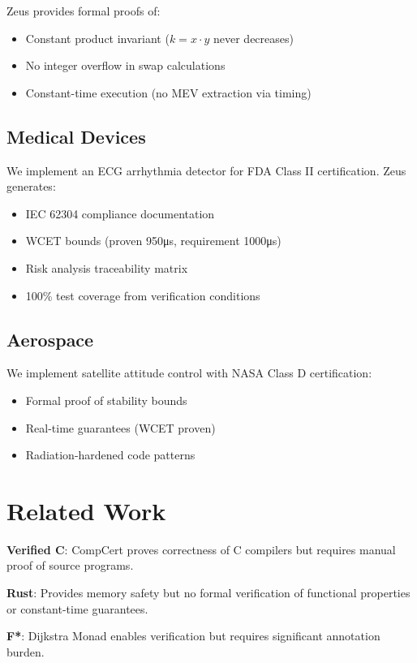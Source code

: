 \documentclass[sigplan,screen]{acmart}
\begin{document}
Zeus provides formal proofs of:
\begin{itemize}
\item Constant product invariant ($k = x \cdot y$ never decreases)
\item No integer overflow in swap calculations
\item Constant-time execution (no MEV extraction via timing)
\end{itemize}

\subsection{Medical Devices}

We implement an ECG arrhythmia detector for FDA Class II certification. Zeus generates:
\begin{itemize}
\item IEC 62304 compliance documentation
\item WCET bounds (proven 950μs, requirement 1000μs)
\item Risk analysis traceability matrix
\item 100\% test coverage from verification conditions
\end{itemize}

\subsection{Aerospace}

We implement satellite attitude control with NASA Class D certification:
\begin{itemize}
\item Formal proof of stability bounds
\item Real-time guarantees (WCET proven)
\item Radiation-hardened code patterns
\end{itemize}

\section{Related Work}

\textbf{Verified C}: CompCert proves correctness of C compilers but requires manual proof of source programs.

\textbf{Rust}: Provides memory safety but no formal verification of functional properties or constant-time guarantees.

\textbf{F*}: Dijkstra Monad enables verification but requires significant annotation burden.
\end{document}
